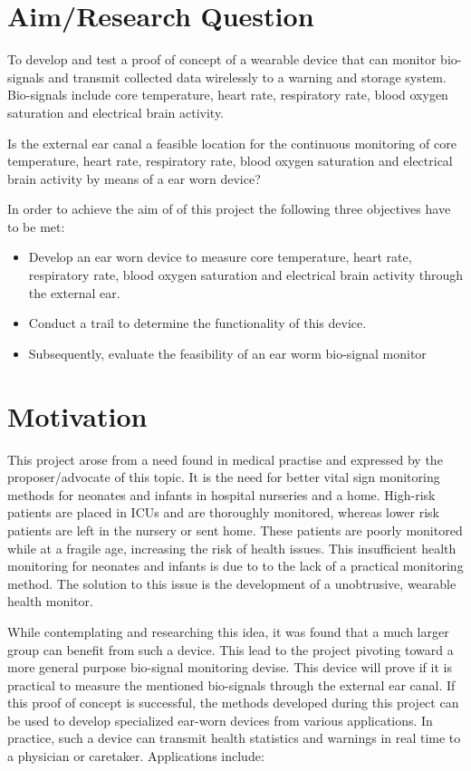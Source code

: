\section{Aim/Research Question}
To develop and test a proof of concept of a wearable device that can monitor bio-signals and transmit collected data wirelessly to a warning and storage system. Bio-signals include core temperature, heart rate, respiratory rate, blood oxygen saturation and electrical brain activity.

\medskip

Is the external ear canal a feasible location for the continuous monitoring of core temperature, heart rate, respiratory rate, blood oxygen saturation and electrical brain activity by means of a ear worn device?

\medskip

In order to achieve the aim of of this project the following three objectives have to be met:
\begin{itemize}
\item Develop an ear worn device to measure core temperature, heart rate, respiratory rate, blood oxygen saturation and electrical brain activity through the external ear.
\item Conduct a trail to determine the functionality of this device.
\item Subsequently, evaluate the feasibility of an ear worm bio-signal monitor
\end{itemize}

\section{Motivation}
This project arose from a need found in medical practise and expressed by the proposer/advocate of this topic. It is the need for better vital sign monitoring methods for neonates and infants in hospital nurseries and a home. High-risk patients are placed in ICUs and are thoroughly monitored, whereas lower risk patients are left in the nursery or sent home. These patients are poorly monitored while at a fragile age, increasing the risk of health issues. This insufficient health monitoring for neonates and infants is due to to the lack of a practical monitoring method. The solution to this issue is the development of a unobtrusive, wearable health monitor.

\medskip

While contemplating and researching this idea, it was found that a much larger group can benefit from such a device. This lead to the project pivoting toward a more general purpose bio-signal monitoring devise. This device will prove if it is practical to measure the mentioned bio-signals through the external ear canal. If this proof of concept is successful, the methods developed during this project can be used to develop specialized ear-worn devices from various applications. In practice, such a device can transmit health statistics and warnings in real time to a physician or caretaker. Applications include:

